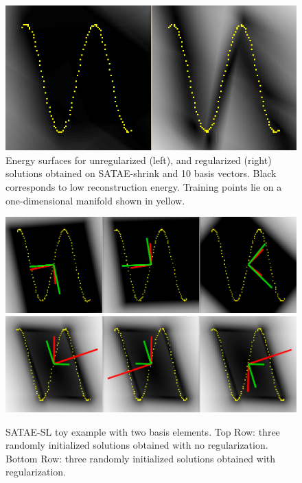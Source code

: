 \begin{figure} \centering \includegraphics[scale=0.25]{./figures/SATAE/toy_shrink.png}
\caption{Energy surfaces for unregularized (left), and regularized (right)
solutions obtained on SATAE-shrink and 10 basis vectors. Black corresponds to
low reconstruction energy. Training points lie on a one-dimensional manifold
shown in yellow.}  \label{fig:toyshrink} \end{figure} 

\begin{figure} \centering
\includegraphics[scale=0.25]{./figures/SATAE/toy_sat_linear_noreg.png}
\includegraphics[scale=0.25]{./figures/SATAE/toy_sat_linear_reg.png} \caption{SATAE-SL toy
example with two basis elements. Top Row: three randomly initialized solutions
obtained with no regularization. Bottom Row: three randomly initialized
solutions obtained with regularization.}  \label{fig:toysatlinear} \end{figure} 

